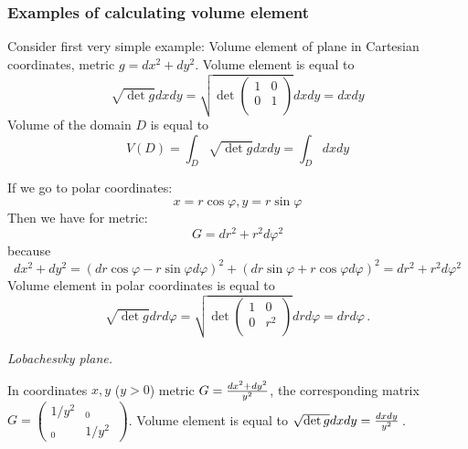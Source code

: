 \documentclass[12pt]{article}
\theoremstyle{theorem}
\numberwithin{equation}{section}
\begin{document}


\subsubsection { Examples of calculating volume element}


Consider first very simple example: Volume element of plane in Cartesian coordinates,
metric $g=dx^2+dy^2$. Volume element  is equal to
                      $$
         \sqrt {\det g}dxdy=
         \sqrt
           {
         \det
         \left(
    \begin{array}{cc}
  1 & 0 \\
  0&  1 \\
\end{array}
\right)}dxdy=dxdy
                      $$
  Volume of the domain $D$ is equal to
              $$
          V(D)=\int_D\sqrt {\det g}dxdy=\int_D dxdy
              $$

If we go to polar coordinates:
 \begin{equation}\label{polarcoord1}
    x=r\cos\varphi, y=r\sin\varphi
\end{equation}
Then we have for metric:
              $$
G=dr^2+r^2d\varphi^2
              $$
because
               \begin{equation}\label{polarknow}
       dx^2+dy^2=(dr\cos\varphi-r\sin\varphi d\varphi)^2+
    (dr\sin\varphi+r\cos\varphi d\varphi)^2
       =dr^2+r^2 d\varphi^2
              \end{equation}
Volume element in polar coordinates is equal to
  $$
           \sqrt {\det g}drd\varphi=
         \sqrt
           {
         \det
         \left(
    \begin{array}{cc}
  1 & 0 \\
  0&  r^2 \\
\end{array}
\right)}drd\varphi=drd\varphi\,.
  $$

\m

{\it Lobachesvky plane.}

 In coordinates $x,y$ ($y>0$) metric $G={dx^2+dy^2\over y^2}$,
 the corresponding matrix $G=\begin{pmatrix}
      {1/y^2} & _0 \\
   _0 & {1/y^2} \
 \end{pmatrix}$. Volume element is equal to
 $\sqrt {\det g} dxdy={dxdy\over y^2}$\,.
\end{document}
